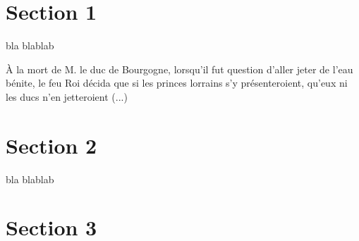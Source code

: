 \documentclass{article}
\begin{document}
\section{Section 1}
bla blablab

\`A la mort de M. le \gls{duc} de Bourgogne, lorsqu'il fut question d'aller jeter de l'eau b\'enite, le feu Roi d\'ecida que si les princes lorrains s'y pr\'esenteroient, qu'eux ni les \gls{ducs} n'en jetteroient (...)

\section{Section 2}

bla blablab

\section{Section 3}

\printindex 

\printglossaries
\end{document}
